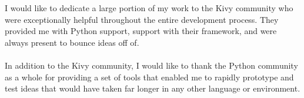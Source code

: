 I would like to dedicate a large portion of my work to the Kivy community who were exceptionally helpful throughout the entire development process. They provided me with Python support, support with their framework, and were always present to bounce ideas off of.
\\
\\
In addition to the Kivy community, I would like to thank the Python community as a whole for providing a set of tools that enabled me to rapidly prototype and test ideas that would have taken far longer in any other language or environment.
